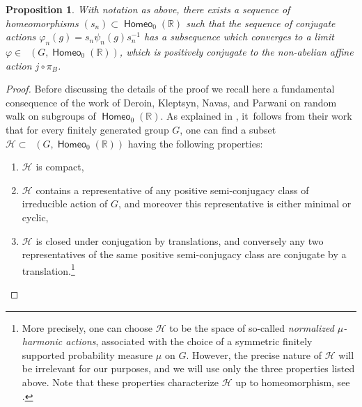 \documentclass[JEP,XML,SOM,Unicode,NoFloatCountersInSection,published]{cedram}
\newtheorem{prop}[thm]{Proposition}
\theoremstyle{definition}
\DeclareMathOperator{\homeo}{\mathsf{Homeo}}
\DeclareMathOperator{\Homirr}{\mathsf{Hom}_{\mathrm{irr}}}
\newcommand{\R}{\mathbb{R}}
\begin{document}
\begin{prop}\label{prop ejemplo no acumulado}
With notation as above, there exists a sequence of homeomorphisms $(s_n)\subset \homeo_0(\R)$ such that the sequence of conjugate actions $ \varphi_n(g)=s_n\psi_n(g)s_n^{-1}$ has a subsequence which converges to a limit $\varphi\in \Homirr(G, \homeo_0(\R))$, which is positively conjugate to the non-abelian affine action $j\circ \pi_B$.
\end{prop}
\begin{proof}
Before discussing the details of the proof we recall here a fundamental consequence of the work of Deroin, Kleptsyn, Navas, and Parwani \cite{DKNP} on random walk on subgroups of $\homeo_0(\R)$. As explained in \cite[\S 14]{BMRT}, it~follows from their work that for every finitely generated group $G$, one can find a subset $\mathscr{H}\subset \Homirr(G,\homeo_0(\R))$ having the following properties:
\begin{enumerate}
\item $\mathscr{H}$ is compact,
\item $\mathscr{H}$ contains a representative of any positive semi-conjugacy class of irreducible action of $G$, and moreover this representative is either minimal or cyclic,
\item $\mathscr{H}$ is closed under conjugation by translations, and conversely any two representatives of the same positive semi-conjugacy class are conjugate by a translation.\footnote{More precisely, one can choose $\mathscr{H}$ to be the space of so-called \emph{normalized $\mu$-harmonic actions}, associated with the choice of a symmetric finitely supported probability measure $\mu$ on $G$. However, the precise nature of $\mathscr{H}$ will be irrelevant for our purposes, and we will use only the three properties listed above. Note that these properties characterize $\mathscr{H}$ up to homeomorphism, see \cite[\S 3]{BMRT-Deroin}.}
\end{enumerate}


\end{proof}
\end{document}
